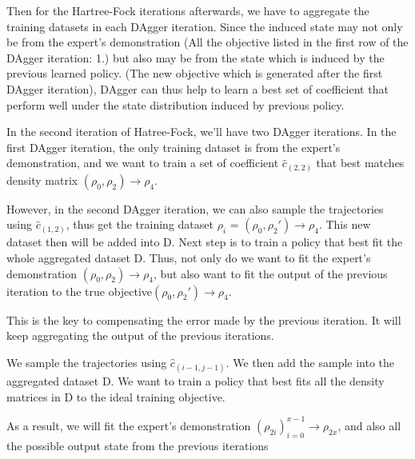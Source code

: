 \documentclass[twoside]{article}
\begin{document}
Then for the Hartree-Fock iterations afterwards, we have to aggregate the training datasets in each DAgger iteration. Since the induced state may not only be from the expert's demonstration (All the objective listed in the first row of the DAgger iteration: 1.) but also
 may be from the state which is induced by the previous learned policy. (The new objective which is generated after the first DAgger iteration), DAgger can thus help to learn a best set of coefficient that perform well under the state distribution induced by previous policy.

In the second iteration of Hatree-Fock, we'll have two DAgger iterations. In the first DAgger iteration, the only training dataset is from the expert's demonstration, and we want to train a set of coefficient  $\hat{c}_{(2,2)}$ that best matches density matrix $(\rho_0,\rho_2) \rightarrow \rho_4$.

However, in the second DAgger iteration, we can also sample the trajectories using $\hat{c}_{(1,2)}$, thus get the training dataset $\rho_i$ = $(\rho_0, \rho_2') \rightarrow \rho_4$. This new dataset then will be added into D.
Next step is to train a policy that best fit the whole aggregated dataset D. Thus, not only do we want to fit the expert's demonstration $(\rho_0, \rho_2) \rightarrow \rho_4$, but also want to fit the output of the previous iteration to the true objective$ (\rho_0,\rho_{2}') \rightarrow \rho_4$. 


This is the key to compensating the error made by the previous iteration. It will keep aggregating the output of the previous iterations.






We sample the trajectories using $\hat{c}_{(i-1,j-1)}$. We then add the sample into the aggregated dataset D.
We want to train a policy that best fits all the density matrices in D to the ideal training objective.


As a result, we will fit the expert's demonstration $(\rho_{2i})_{i=0}^{x-1} \rightarrow \rho_{2x}$, and also all the possible output state from the previous iterations 
\end{document}
